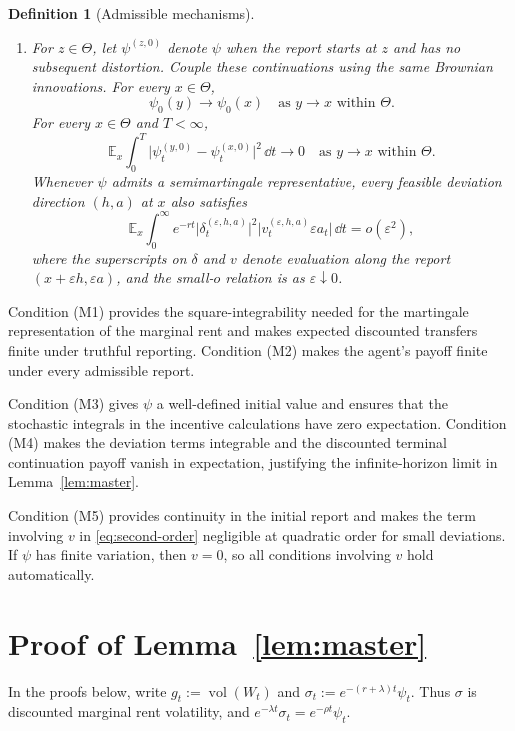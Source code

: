 \documentclass[12pt]{article}
\newtheorem{definition}{Definition}
\DeclareMathOperator{\vol}{vol}
\newcommand{\E}{\mathbb{E}}
\begin{document}
\begin{definition}[Admissible mechanisms]
\begin{enumerate}[label=\textnormal{(M\arabic*)},leftmargin=2.8em]
  \item For \(z\in\Theta\), let \(\psi^{(z,0)}\) denote \(\psi\) when
  the report starts at \(z\) and has no subsequent distortion. Couple
  these continuations using the same Brownian innovations. For every
  \(x\in\Theta\),
  \[
    \psi_0(y)\longrightarrow\psi_0(x)
    \quad\text{as }y\to x\text{ within }\Theta.
  \]
  For every \(x\in\Theta\) and \(T<\infty\),
  \[
    \E_x\int_0^T
      \bigl|\psi_t^{(y,0)}-\psi_t^{(x,0)}\bigr|^2\,\dd t
    \longrightarrow0
    \quad\text{as }y\to x\text{ within }\Theta.
  \]
  Whenever \(\psi\) admits a semimartingale representative, every
  feasible deviation direction \((h,a)\) at \(x\) also satisfies
  \[
    \E_x\int_0^\infty e^{-rt}
      \bigl|\delta_t^{(\varepsilon,h,a)}\bigr|^2
      \bigl|v_t^{(\varepsilon,h,a)}
             \varepsilon a_t\bigr|\,\dd t
    =
    o(\varepsilon^2),
  \]
  where the superscripts on \(\delta\) and \(v\) denote evaluation
  along the report \((x+\varepsilon h,\varepsilon a)\), and the
  small-\(o\) relation is as \(\varepsilon\downarrow0\).
\end{enumerate}
\end{definition}

Condition (M1) provides the square-integrability needed for the
martingale representation of the marginal rent and makes expected
discounted transfers finite under truthful reporting. Condition (M2)
makes the agent's payoff finite under every admissible report.

Condition (M3) gives \(\psi\) a well-defined initial value and ensures
that the stochastic integrals in the incentive calculations have zero
expectation. Condition (M4) makes the deviation terms integrable and
the discounted terminal continuation payoff vanish in expectation,
justifying the infinite-horizon limit in Lemma~\ref{lem:master}.

Condition (M5) provides continuity in the initial report and makes the
term involving \(v\) in \eqref{eq:second-order} negligible at quadratic
order for small deviations. If \(\psi\) has finite variation, then
\(v=0\), so all conditions involving \(v\) hold automatically.



\section{Proof of Lemma~\ref{lem:master}}
\label{app:proof-master}

In the proofs below, write
\(
  g_t:=\vol(W_t)\) and \(
  \sigma_t:=e^{-(r+\lambda)t}\psi_t.
\)
Thus \(\sigma\) is discounted marginal rent volatility, and
\(e^{-\lambda t}\sigma_t=e^{-\rho t}\psi_t\). %
\end{document}
